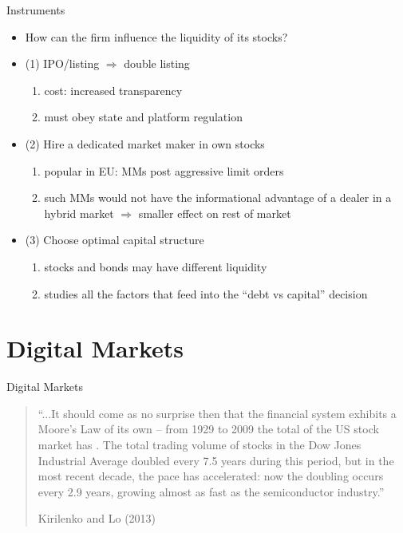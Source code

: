 \documentclass[english,10pt
,aspectratio=169
]{beamer}
\begin{document}
\begin{frame}{Instruments}
	\begin{itemize}
		\item How can the firm influence the liquidity of its stocks?
		\item (1) IPO/listing $\Rightarrow$ double listing
		\begin{enumerate}
			\item cost: increased transparency
			\item must obey state and platform regulation
		\end{enumerate}
		\item (2) Hire a dedicated market maker in own stocks
		\begin{enumerate}
			\item popular in EU: MMs post aggressive limit orders
			\item such MMs would not have the informational advantage of a dealer in a hybrid market $\Rightarrow$ smaller effect on rest of market
		\end{enumerate}
		\item (3) Choose optimal capital structure
		\begin{enumerate}
			\item stocks and bonds may have different liquidity
			\item {} studies all the factors that feed into the ``debt vs capital'' decision
		\end{enumerate}
	\end{itemize}
\end{frame}



\section{Digital Markets}

\begin{frame}{Digital Markets}
	\begin{quotation}
		``...It should come as no surprise then that the financial system exhibits a Moore's Law of its own -- from 1929 to 2009 the total  of the US stock market has . The total \alert{trading volume} of stocks in the Dow Jones Industrial Average \alert{doubled every 7.5 years} during this period, but in the most recent decade, the \alert{pace has accelerated}: now the doubling occurs every 2.9 years, growing almost as fast as the semiconductor industry.''
		\begin{flushright}
			Kirilenko and Lo (2013)
		\end{flushright}
	\end{quotation}
\end{frame}
\end{document}
